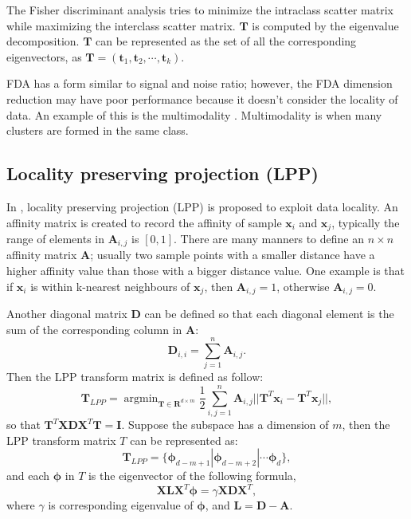 The Fisher discriminant analysis tries to minimize the intraclass scatter matrix while maximizing the interclass scatter matrix. $\bm{T}$ is computed by the eigenvalue decomposition. $\bm{T}$ can be represented as the set of all the corresponding eigenvectors, as $ \bm{T} = (\bm{t}_1,\bm{t}_2,\cdots,\bm{t}_k)$.

FDA has a form similar to signal and noise ratio; however, the FDA dimension reduction may have poor performance because it doesn't consider the locality of data. An example of this is the multimodality \cite{KLFDA}. Multimodality is when many clusters are formed in the same class. 

\subsection{Locality preserving projection (LPP)}

In \cite{LPP}, locality preserving projection (LPP) is proposed to exploit data locality. An affinity matrix is created to record the affinity of sample $\bm{x}_i$ and $\bm{x}_j$,  typically the range of elements in $\bm{A}_{i,j}$ is $[0,1]$. There are many manners to define an $n \times n$ affinity matrix $\bm{A}$; usually two sample points with a smaller distance have a higher affinity value than those with a bigger distance value. One example is that if  $\bm{x}_i$ is within k-nearest neighbours of $\bm{x}_j$, then $\bm{A}_{i,j} = 1$, otherwise  $\bm{A}_{i,j} = 0$.  

Another diagonal matrix $\bm{D}$ can be defined so that each diagonal element is the sum of the corresponding column in $\bm{A}$:
\begin{equation}
\bm{D}_{i,i} = \mathop{\sum}_{j=1}^n \bm{A}_{i, j}.
\end{equation}
Then the LPP transform matrix is defined as follow:
\begin{equation}
\bm{T}_{LPP} = \mathop{\arg\min}_{\bm{T}\in\bm{R}^{d\times m}} \frac{1}{2}\mathop{\sum}_{i, j= 1}^n \bm{A}_{i,j} ||\bm{T}^T\bm{x}_i - \bm{T}^T\bm{x}_j||,
\end{equation}
so that $ \bm{T}^T\bm{X}\bm{D}\bm{X}^T\bm{T} = \bm{I} $.
Suppose the subspace has a dimension of $m$, then the LPP transform matrix $T$ can be represented as:
\begin{equation}
\bm{T}_{LPP} = \{ \bm{\phi}_{d-m+1} | \bm{\phi}_{d-m+2} | \cdots \bm{\phi}_{d}\},
\end{equation}
and each $\bm{\phi}$ in $T$ is the eigenvector of the following formula,
 \begin{equation}
\bm{X}\bm{L}\bm{X}^T\bm{\phi} = \gamma\bm{X}\bm{D}\bm{X}^T,
\end{equation}
where $\gamma$ is corresponding eigenvalue of $\bm{\phi}$, and $\bm{L} = \bm{D} - \bm{A}$.

